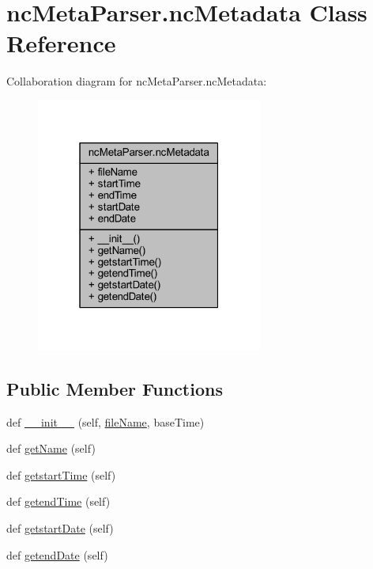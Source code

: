 \hypertarget{classnc_meta_parser_1_1nc_metadata}{}\section{nc\+Meta\+Parser.\+nc\+Metadata Class Reference}
\label{classnc_meta_parser_1_1nc_metadata}


Collaboration diagram for nc\+Meta\+Parser.\+nc\+Metadata\+:\nopagebreak
\begin{figure}[H]
\begin{center}
\leavevmode
\includegraphics[width=211pt]{classnc_meta_parser_1_1nc_metadata__coll__graph}
\end{center}
\end{figure}
\subsection*{Public Member Functions}
\begin{DoxyCompactItemize}
\item 
def \mbox{\hyperlink{classnc_meta_parser_1_1nc_metadata_aa36a1deb53cfbaee8976287877fa20fb}{\+\_\+\+\_\+init\+\_\+\+\_\+}} (self, \mbox{\hyperlink{classnc_meta_parser_1_1nc_metadata_a119acc5dbb77f035d27533b6fbe4a8c1}{file\+Name}}, base\+Time)
\item 
def \mbox{\hyperlink{classnc_meta_parser_1_1nc_metadata_ac262e3bca9dc97d7d55056a1931e6d1e}{get\+Name}} (self)
\item 
def \mbox{\hyperlink{classnc_meta_parser_1_1nc_metadata_afe2e767476347158c9359cc8c5afef21}{getstart\+Time}} (self)
\item 
def \mbox{\hyperlink{classnc_meta_parser_1_1nc_metadata_ad41081000ceb1f7aa122d5e4a1b674e4}{getend\+Time}} (self)
\item 
def \mbox{\hyperlink{classnc_meta_parser_1_1nc_metadata_a79b7ca324dcadb2f56066db1c663794a}{getstart\+Date}} (self)
\item 
def \mbox{\hyperlink{classnc_meta_parser_1_1nc_metadata_aea9c594ebe892b650ef724bdb73820e4}{getend\+Date}} (self)
\end{DoxyCompactItemize}
